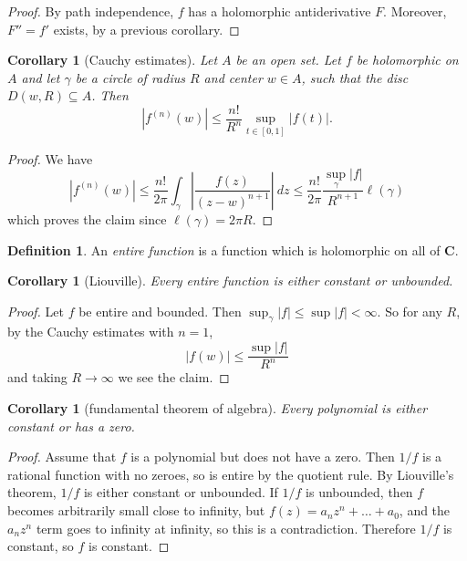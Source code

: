 \documentclass[12pt]{report}
\newcommand{\CC}{\mathbf{C}}
\newcommand{\dfn}[1]{\emph{#1}\index{#1}}
\newtheorem{corollary}[theorem]{Corollary}
\theoremstyle{definition}
\newtheorem{definition}[theorem]{Definition}
\theoremstyle{remark}
\begin{document}
\begin{proof}
By path independence, $f$ has a holomorphic antiderivative $F$. Moreover, $F'' = f'$ exists, by a previous corollary.
\end{proof}
\begin{corollary}[Cauchy estimates]
Let $A$ be an open set. Let $f$ be holomorphic on $A$ and let $\gamma$ be a circle of radius $R$ and center $w \in A$, such that the disc $D(w, R) \subseteq A$. Then
$$|f^{(n)}(w)| \leq \frac{n!}{R^n} \sup_{t \in [0, 1]} |f(t)|.$$
\end{corollary}
\begin{proof}
We have
$$|f^{(n)}(w)| \leq \frac{n!}{2\pi} \int_\gamma \left|\frac{f(z)}{(z - w)^{n+1}}\right| ~dz	\leq \frac{n!}{2\pi} \frac{\sup_\gamma |f|}{R^{n+1}}\ell(\gamma)$$
which proves the claim since $\ell(\gamma) = 2\pi R$.
\end{proof}
\begin{definition}
An \dfn{entire function} is a function which is holomorphic on all of $\CC$.
\end{definition}
\begin{corollary}[Liouville]
Every entire function is either constant or unbounded.
\end{corollary}
\begin{proof}
Let $f$ be entire and bounded. Then $\sup_\gamma |f| \leq \sup |f| < \infty$. So for any $R$, by the Cauchy estimates with $n = 1$,
$$|f(w)| \leq \frac{\sup |f|}{R^n}$$
and taking $R \to \infty$ we see the claim.
\end{proof}
\begin{corollary}[fundamental theorem of algebra]
Every polynomial is either constant or has a zero.
\end{corollary}
\begin{proof}
Assume that $f$ is a polynomial but does not have a zero. Then $1/f$ is a rational function with no zeroes, so is entire by the quotient rule. By Liouville's theorem, $1/f$ is either constant or unbounded. If $1/f$ is unbounded, then $f$ becomes arbitrarily small close to infinity, but $f(z) = a_nz^n + \dots + a_0$, and the $a_nz^n$ term goes to infinity at infinity, so this is a contradiction. Therefore $1/f$ is constant, so $f$ is constant.
\end{proof}


\printindex
\end{document}
